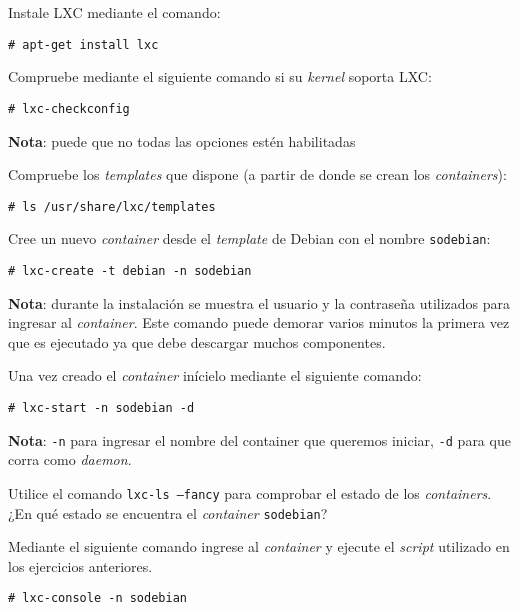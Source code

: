 \begin{questions}

  \question Instale LXC mediante el comando:
\begin{verbatim}
# apt-get install lxc
\end{verbatim}
  
  \question Compruebe mediante el siguiente comando si su \textit{kernel} soporta
  LXC:
\begin{verbatim}
# lxc-checkconfig
\end{verbatim}
  {\small \textbf{Nota}: puede que no todas las opciones estén habilitadas }

  \question Compruebe los \textit{templates} que dispone (a partir de donde se
  crean los \textit{containers}):
\begin{verbatim}
# ls /usr/share/lxc/templates
\end{verbatim}
  
  \question Cree un nuevo \textit{container} desde el \textit{template} de Debian
  con el nombre \texttt{sodebian}:
\begin{verbatim}
# lxc-create -t debian -n sodebian
\end{verbatim}
  {\small \textbf{Nota}: durante la instalación se muestra el usuario y la
  contraseña utilizados para ingresar al \textit{container}. Este comando
  puede demorar varios minutos la primera vez que es ejecutado ya que debe
  descargar muchos componentes. }
  
  \question Una vez creado el \textit{container} inícielo mediante el siguiente
  comando:
\begin{verbatim}
# lxc-start -n sodebian -d
\end{verbatim}
  {\small \textbf{Nota}: \texttt{-n} para ingresar el nombre del container que
  queremos iniciar, \texttt{-d} para que corra como \textit{daemon}.}
  
  \question Utilice el comando \texttt{lxc-ls --fancy} para comprobar el estado
  de los \textit{containers}. ¿En qué estado se encuentra el
  \textit{container} \texttt{sodebian}?
  
  \question Mediante el siguiente comando ingrese al \textit{container} y
  ejecute el \textit{script} utilizado en los ejercicios anteriores.
\begin{verbatim}
# lxc-console -n sodebian
\end{verbatim}

\end{questions}

